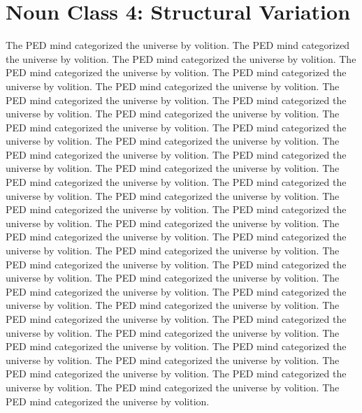 \section{Noun Class 4: Structural Variation}
The PED mind categorized the universe by volition. The PED mind categorized the universe by volition. The PED mind categorized the universe by volition. The PED mind categorized the universe by volition. The PED mind categorized the universe by volition. The PED mind categorized the universe by volition. The PED mind categorized the universe by volition. The PED mind categorized the universe by volition. The PED mind categorized the universe by volition. The PED mind categorized the universe by volition. The PED mind categorized the universe by volition. The PED mind categorized the universe by volition. The PED mind categorized the universe by volition. The PED mind categorized the universe by volition. The PED mind categorized the universe by volition. The PED mind categorized the universe by volition. The PED mind categorized the universe by volition. The PED mind categorized the universe by volition. The PED mind categorized the universe by volition. The PED mind categorized the universe by volition. The PED mind categorized the universe by volition. The PED mind categorized the universe by volition. The PED mind categorized the universe by volition. The PED mind categorized the universe by volition. The PED mind categorized the universe by volition. The PED mind categorized the universe by volition. The PED mind categorized the universe by volition. The PED mind categorized the universe by volition. The PED mind categorized the universe by volition. The PED mind categorized the universe by volition. The PED mind categorized the universe by volition. The PED mind categorized the universe by volition. The PED mind categorized the universe by volition. The PED mind categorized the universe by volition. The PED mind categorized the universe by volition. The PED mind categorized the universe by volition. The PED mind categorized the universe by volition. The PED mind categorized the universe by volition. The PED mind categorized the universe by volition. The PED mind categorized the universe by volition. 

